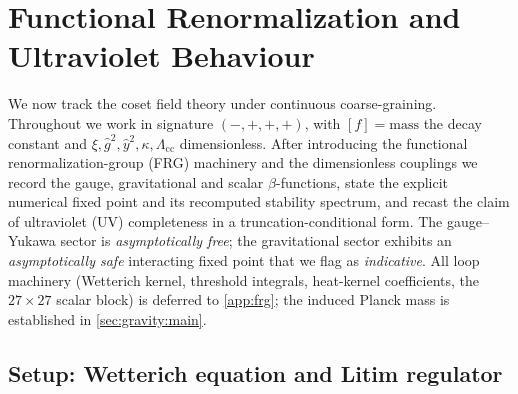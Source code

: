 \section{Functional Renormalization and Ultraviolet Behaviour}
\label{sec:frg:main}

We now track the coset field theory under continuous coarse-graining.
Throughout we work in signature $(-,+,+,+)$, with $[f]=\text{mass}$ the
decay constant and $\xi,\hat g^{2},\hat y^{2},\kappa,\Lambda_{\mathrm{cc}}$
dimensionless. After introducing the functional renormalization-group
(FRG) machinery and the dimensionless couplings we record the gauge,
gravitational and scalar $\beta$-functions, state the explicit numerical
fixed point and its recomputed stability spectrum, and recast the claim of
ultraviolet (UV) completeness in a truncation-conditional form.
The gauge--Yukawa sector is \emph{asymptotically free}; the gravitational
sector exhibits an \emph{asymptotically safe} interacting fixed point that
we flag as \emph{indicative}. All loop machinery (Wetterich kernel,
threshold integrals, heat-kernel coefficients, the $27\times27$ scalar
block) is deferred to \autoref{app:frg}; the induced Planck mass is
established in \autoref{sec:gravity:main}.

\subsection{Setup: Wetterich equation and Litim regulator}
\label{sec:frg:setup}

